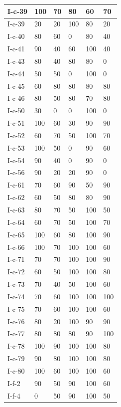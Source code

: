 \documentclass[11pt,a4paper]{article}
\begin{document}
\begin{table}[h]
\begin{tabular}{|l|l|l|l|l|l|}
I-c-39 & 100 & 70 & 80 & 60 & 70 \\ \hline
I-c-39 & 20 & 20 & 100 & 80 & 20 \\ \hline
I-c-40 & 80 & 60 & 0 & 80 & 40 \\ \hline
I-c-41 & 90 & 40 & 60 & 100 & 40 \\ \hline
I-c-43 & 80 & 40 & 80 & 80 & 0 \\ \hline
I-c-44 & 50 & 50 & 0 & 100 & 0 \\ \hline
I-c-45 & 60 & 80 & 80 & 80 & 80 \\ \hline
I-c-46 & 80 & 50 & 80 & 70 & 80 \\ \hline
I-c-50 & 30 & 0 & 0 & 100 & 0 \\ \hline
I-c-51 & 100 & 60 & 30 & 90 & 90 \\ \hline
I-c-52 & 60 & 70 & 50 & 100 & 70 \\ \hline
I-c-53 & 100 & 50 & 0 & 90 & 60 \\ \hline
I-c-54 & 90 & 40 & 0 & 90 & 0 \\ \hline
I-c-56 & 90 & 20 & 20 & 90 & 0 \\ \hline
I-c-61 & 70 & 60 & 90 & 50 & 90 \\ \hline
I-c-62 & 60 & 50 & 80 & 80 & 90 \\ \hline
I-c-63 & 80 & 70 & 50 & 100 & 50 \\ \hline
I-c-64 & 60 & 70 & 50 & 100 & 70 \\ \hline
I-c-65 & 100 & 60 & 80 & 100 & 90 \\ \hline
I-c-66 & 100 & 70 & 100 & 100 & 60 \\ \hline
I-c-71 & 70 & 70 & 100 & 100 & 90 \\ \hline
I-c-72 & 60 & 50 & 100 & 100 & 80 \\ \hline
I-c-73 & 70 & 40 & 50 & 100 & 60 \\ \hline
I-c-74 & 70 & 60 & 100 & 100 & 100 \\ \hline
I-c-75 & 70 & 60 & 100 & 100 & 60 \\ \hline
I-c-76 & 80 & 20 & 100 & 90 & 90 \\ \hline
I-c-77 & 80 & 80 & 80 & 90 & 100 \\ \hline
I-c-78 & 100 & 90 & 100 & 100 & 80 \\ \hline
I-c-79 & 90 & 80 & 100 & 100 & 80 \\ \hline
I-c-80 & 100 & 60 & 100 & 100 & 60 \\ \hline
I-f-2 & 90 & 50 & 90 & 100 & 60 \\ \hline
I-f-4 & 0 & 50 & 90 & 100 & 50 \\ \hline

\end{tabular}
\end{table}
\end{document}
